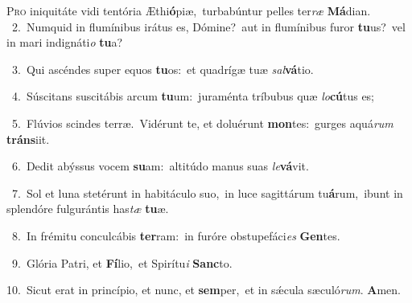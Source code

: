 \lettrine{\initial\textcolor{\initialcolor}{P}}{ro} iniquitáte vidi tentória Æthi\-\textbf{ó}\-piæ,~\star turbabúntur pelles ter\textit{ræ} \textbf{Má}\-dian.\\
{\numbfont\textcolor{\numbcolor}{~2.}}~Numquid in flumínibus irátus es, Dómine?~\dagger aut in flumínibus furor \textbf{tu}\-us?~\star vel in mari indignáti\textit{o} \textbf{tu}\-a?\par
{\numbfont\textcolor{\numbcolor}{~3.}}~Qui ascéndes super equos \textbf{tu}\-os:~\star et quadrígæ tuæ \textit{sal}\-\textbf{vá}tio.\par
{\numbfont\textcolor{\numbcolor}{~4.}}~Súscitans suscitábis arcum \textbf{tu}\-um:~\star juraménta tríbubus quæ \textit{lo}\-\textbf{cú}tus es;\par
{\numbfont\textcolor{\numbcolor}{~5.}}~Flúvios scindes terræ.~\dagger Vidérunt te, et doluérunt \textbf{mon}\-tes:~\star gurges aquá\textit{rum} \textbf{tráns}\-iit.\par
{\numbfont\textcolor{\numbcolor}{~6.}}~Dedit abýssus vocem \textbf{su}\-am:~\star altitúdo manus suas \textit{le}\-\textbf{vá}vit.\par
{\numbfont\textcolor{\numbcolor}{~7.}}~Sol et luna stetérunt in habitáculo suo,~\dagger in luce sagittárum tu\-\textbf{á}\-rum,~\star ibunt in splendóre fulgurántis has\textit{tæ} \textbf{tu}\-æ.\par
{\numbfont\textcolor{\numbcolor}{~8.}}~In frémitu conculcábis \textbf{ter}\-ram:~\star in furóre obstupefáci\textit{es} \textbf{Gen}\-tes.\par
{\numbfont\textcolor{\numbcolor}{~9.}}~Glória Patri, et \textbf{Fí}\-lio,~\star et Spirítu\textit{i} \textbf{Sanc}\-to.\par
{\numbfont\textcolor{\numbcolor}{10.}}~Sicut erat in princípio, et nunc, et \textbf{sem}\-per,~\star et in sǽcula sæculó\-\textit{rum}\-. \textbf{A}\-men.\par
